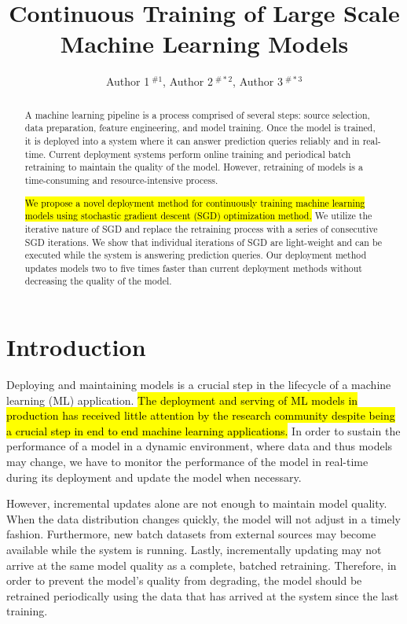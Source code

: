 \documentclass[10pt,conference,letterpaper]{IEEEtran}
\title{Continuous Training of Large Scale Machine Learning Models}
\author{
{Author 1{\small $~^{\# 1}$}, Author 2{\small $~^{\# *2}$}, Author 3{\small $~^{\# *3}$} }}
\begin{document}
\maketitle
\begin{abstract}
A machine learning pipeline is a process comprised of several steps: source selection, data preparation, feature engineering, and model training. 
Once the model is trained, it is deployed into a system where it can answer prediction queries reliably and in real-time.
Current deployment systems perform online training and periodical batch retraining to maintain the quality of the model.
However, retraining of models is a time-consuming and resource-intensive process.

\hl{We propose a novel deployment method for continuously training machine learning models using stochastic gradient descent (SGD) optimization method.}
We utilize the iterative nature of SGD and replace the retraining process with a series of consecutive SGD iterations.
We show that individual iterations of SGD are light-weight and can be executed while the system is answering prediction queries.
Our deployment method updates models two to five times faster than current deployment methods without decreasing the quality of the model.
\end{abstract}


\section{Introduction} \label{introduction}
Deploying and maintaining models is a crucial step in the lifecycle of a machine learning (ML) application. 
\hl{The deployment and serving of ML models in production has received little attention by the research community despite being a crucial step in end to end machine learning applications.}
In order to sustain the performance of a model in a dynamic environment, where data and thus models may change, we have to monitor the performance of the model in real-time during its deployment and update the model when necessary.

However, incremental updates alone are not enough to maintain model quality. 
When the data distribution changes quickly, the model will not adjust in a timely fashion. 
Furthermore, new batch datasets from external sources may become available while the system is running.
Lastly, incrementally updating may not arrive at the same model quality as a complete, batched retraining.
Therefore, in order to prevent the model's quality from degrading, the model should be retrained periodically using the data that has arrived at the system since the last training.
\end{document}
